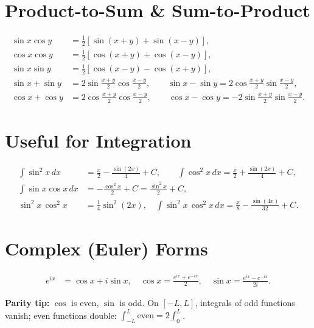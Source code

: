 \documentclass[11pt]{article}
\begin{document}
\section*{Product-to-Sum \& Sum-to-Product}
\begin{align*}
\sin x\cos y&=\tfrac12\!\left[\sin(x{+}y)+\sin(x{-}y)\right],\\
\cos x\cos y&=\tfrac12\!\left[\cos(x{+}y)+\cos(x{-}y)\right],\\
\sin x\sin y&=\tfrac12\!\left[\cos(x{-}y)-\cos(x{+}y)\right],\\[0.4em]
\sin x+\sin y&=2\sin\!\frac{x{+}y}{2}\cos\!\frac{x{-}y}{2},\qquad
\sin x-\sin y=2\cos\!\frac{x{+}y}{2}\sin\!\frac{x{-}y}{2},\\
\cos x+\cos y&=2\cos\!\frac{x{+}y}{2}\cos\!\frac{x{-}y}{2},\qquad
\cos x-\cos y=-2\sin\!\frac{x{+}y}{2}\sin\!\frac{x{-}y}{2}.
\end{align*}

\section*{Useful for Integration}
\begin{align*}
\int \sin^2x\,dx&=\frac{x}{2}-\frac{\sin(2x)}{4}+C,\qquad
\int \cos^2x\,dx=\frac{x}{2}+\frac{\sin(2x)}{4}+C,\\
\int \sin x\cos x\,dx&=-\frac{\cos^2x}{2}+C=\frac{\sin^2x}{2}+C,\\
\sin^2x\,\cos^2x&=\tfrac14\sin^2(2x),\quad
\int \sin^2x\,\cos^2x\,dx=\frac{x}{8}-\frac{\sin(4x)}{32}+C.
\end{align*}

\section*{Complex (Euler) Forms}
\begin{align*}
e^{ix}&=\cos x+i\sin x,\quad
\cos x=\tfrac{e^{ix}+e^{-ix}}{2},\quad
\sin x=\tfrac{e^{ix}-e^{-ix}}{2i}.
\end{align*}

\vspace{0.5em}
\noindent\textbf{Parity tip:} $\cos$ is even, $\sin$ is odd. On $[-L,L]$, integrals of odd functions vanish; even functions double: $\int_{-L}^L \text{even} = 2\!\int_0^L$.
\end{document}
